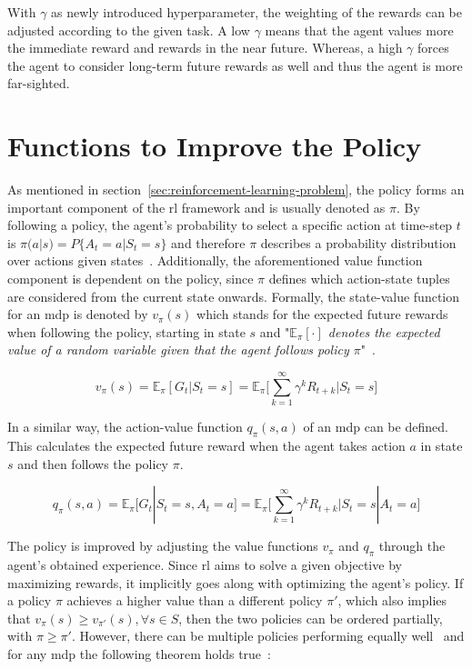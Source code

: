 \documentclass[draft,final]{vutinfth} %
\newcommand{\p}[1]{see p. #1}
\begin{document}
    With $\gamma$ as newly introduced hyperparameter, the weighting of the rewards can be adjusted according to the given task.
    A low $\gamma$ means that the agent values more the immediate reward and rewards in the near future.
    Whereas, a high $\gamma$ forces the agent to consider long-term future rewards as well and thus the agent is more far-sighted.


    \section{Functions to Improve the Policy}\label{sec:functions-to-improve-the-policy}
    As mentioned in section~\ref{sec:reinforcement-learning-problem}, the policy forms an important component of the \gls{rl} framework and is usually denoted as $\pi$.
    By following a policy, the agent's probability to select a specific action at time-step $t$ is $\pi(a|s) = P\{A_t=a|S_t=s\}$ and therefore $\pi$ describes a probability distribution over actions given states~.
    Additionally, the aforementioned value function component is dependent on the policy, since $\pi$ defines which action-state tuples are considered from the current state onwards.
    Formally, the state-value function for an \gls{mdp} is denoted by $v_\pi(s)$ which stands for the expected future rewards when following the policy, starting in state $s$ and "\textit{$\mathbb{E}_\pi[\cdot]$ denotes the expected value of a random variable given that the agent follows policy $\pi$}"~\citep[\p{58}]{sutton_reinforcement_2018}.

    \begin{equation}
        v_\pi(s) = \mathbb{E}_\pi[G_t|S_t = s] = \mathbb{E}_\pi \Bigg[\sum_{k=1}^{\infty} \gamma^k R_{t+k} \bigg| S_t = s \Bigg]\label{eq:value_function}
    \end{equation}

    In a similar way, the action-value function $q_\pi(s,a)$ of an \gls{mdp} can be defined.
    This calculates the expected future reward when the agent takes action $a$ in state $s$ and then follows the policy $\pi$.

    \begin{equation}
        q_\pi(s,a) = \mathbb{E}_\pi[G_t|S_t = s, A_t = a] = \mathbb{E}_\pi \Bigg[\sum_{k=1}^{\infty} \gamma^k R_{t+k} \bigg| S_t = s | A_t = a \Bigg]\label{eq:quality_function}
    \end{equation}

    The policy is improved by adjusting the value functions $v_\pi$ and $q_\pi$ through the agent's obtained experience.
    Since \gls{rl} aims to solve a given objective by maximizing rewards, it implicitly goes along with optimizing the agent's policy.
    If a policy $\pi$ achieves a higher value than a different policy $\pi'$, which also implies that $v_\pi(s) \geq v_{\pi'}(s), \forall s \in \mathit{S}$, then the two policies can be ordered partially, with $\pi \geq \pi'$.
    However, there can be multiple policies performing equally well~\citep[\p{62f}]{sutton_reinforcement_2018} and for any \gls{mdp} the following theorem holds true~\citepOnline[\p{43}]{silver_lecture_2015-1}:
\end{document}
